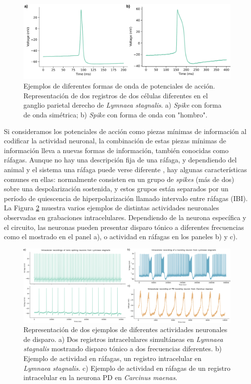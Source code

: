 \begin{figure}[htb!]
	\centering
	\includegraphics[width=\linewidth]{img/intro/spike-types.pdf}
	\caption{Ejemplos de diferentes formas de onda de potenciales de acción. Representación de dos registros de dos células diferentes en el ganglio parietal derecho de \textit{Lymnaea stagnalis}. a) \textit{Spike} con forma de onda simétrica; b) \textit{Spike} con forma de onda con "hombro".}
	\label{fig:spike-types spanish}
\end{figure}

Si consideramos los potenciales de acción como piezas mínimas de información al codificar la actividad neuronal, la combinación de estas piezas mínimas de información lleva a nuevas formas de información, también conocidas como ráfagas. Aunque no hay una descripción fija de una ráfaga, y dependiendo del animal y el sistema una ráfaga puede verse diferente \parencite{russell_bursting_1978,palmu_detection_2010,lundqvist_gamma_2016}, hay algunas características comunes en ellas: normalmente consisten en un grupo de \textit{spikes} (más de dos) sobre una despolarización sostenida, y estos grupos están separados por un período de quiescencia de hiperpolarización llamado intervalo entre ráfagas (IBI). La Figura \ref{fig:spike_activity-types spanish} muestra varios ejemplos de distintas actividades neuronales observadas en grabaciones intracelulares. Dependiendo de la neurona específica y el circuito, las neuronas pueden presentar disparo tónico a diferentes frecuencias como el mostrado en el panel a), o actividad en ráfagas en los paneles b) y c).

\begin{figure}[htb!]
	\centering
	\includegraphics[width=\linewidth]{img/intro/spike_activity-types.png}
	\caption{Representación de dos ejemplos de diferentes actividades neuronales de disparo. a) Dos registros intracelulares simultáneas en \textit{Lymnaea stagnalis} mostrando disparo tónico a dos frecuencias diferentes. b) Ejemplo de actividad en ráfagas, un registro intracelular en \textit{Lymnaea stagnalis}. c) Ejemplo de actividad en ráfagas de un registro intracelular en la neurona PD en \textit{Carcinus maenas}.}
	\label{fig:spike_activity-types spanish}
\end{figure}

